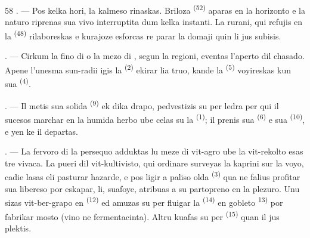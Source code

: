 \begin{VUpage}[60]{58}
. --- Pos kelka hori, la kalmeso rinaskas.\nl
Briloza  \textsuperscript{(52)} aparas en la horizonto e\nl
la naturo riprenas sua vivo interruptita dum\nl
kelka instanti. La rurani, qui refujis en la\nl
{} \textsuperscript{(48)} rilaboreskas e kurajoze esforcas re\cc
parar la domaji quin li jus subisis.

\VUsaut{6.0mm}
\VUsaut{3.6mm}

\VUsaut{1.4mm}
\VUsaut{4.0mm}

. --- Cirkum la fino di  o la mezo di\nl
{}, segun la regioni, eventas l'aperto\nl
dil chasado. Apene l'unesma sun-radii igis la\nl
{} \textsuperscript{(2)} ekirar lia truo, kande la  \textsuperscript{(5)}\nl
voyireskas kun sua  \textsuperscript{(4)}.

. --- Il metis sua solida  \textsuperscript{(9)} ek\nl
dika drapo, pedvestizis su per ledra  per\nl
qui il sucesos marchar en la humida herbo ube\nl
celas su la  \textsuperscript{(1)}; il prenis sua  \textsuperscript{(6)} e\nl
sua  \textsuperscript{(10)}, e yen ke il departas.

. --- La fervoro di la persequo adduktas lu\nl
meze di vit-agro ube la vit-rekolto esas tre\nl
vivaca. La pueri dil vit-kultivisto, qui ordinare\nl
surveyas la kaprini sur la voyo, cadie lasas eli\nl
pasturar hazarde, e pos ligir a paliso olda \cc
{} \textsuperscript{(3)} qua ne falius profitar sua libereso por\nl
eskapar, li, suafoye, atribuas a su partopreno\nl
en la plezuro. Unu sizas vit-ber-grapo en \cc
{} \textsuperscript{(12)} ed amuzas su per fluigar la\nl
{} \textsuperscript{(14)} en gobleto \textsuperscript{13)} por fabrikar mosto\nl
(vino ne fermentacinta). Altru kuafas su per\nl
{} \textsuperscript{(15)} quan il jus plektis.
\parplein
\end{VUpage}

